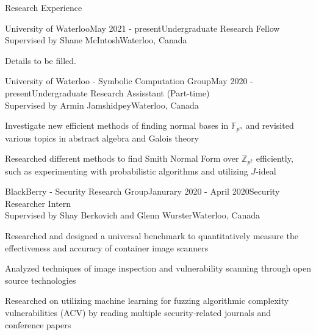 \documentclass{cv}
\begin{document}
\begin{rSection}{Research Experience}
\begin{rSubsection}{University of Waterloo}{May 2021 - present}{Undergraduate Research Fellow \\ Supervised by Shane McIntosh}{Waterloo, Canada}
	\item Details to be filled.
\end{rSubsection}

\begin{rSubsection}{University of Waterloo - Symbolic Computation Group}{May 2020 - present}{Undergraduate Research Assisstant (Part-time)\\ Supervised by Armin Jamshidpey}{Waterloo, Canada}
  	\item Investigate new efficient methods of finding normal bases in $\mathbb{F}_{p^n}$ and revisited various topics in abstract algebra and Galois theory\item Researched different methods to find Smith Normal Form over $\mathbb{Z}_{p^2}$ efficiently, such as experimenting with probabilistic algorithms and utilizing $J$-ideal
\end{rSubsection}

\begin{rSubsection}{BlackBerry - Security Research Group}{Janurary 2020 - April 2020}{Security Researcher Intern \\ Supervised by Shay Berkovich and Glenn Wurster}{Waterloo, Canada}
	\item Researched and designed a universal benchmark to quantitatively measure the effectiveness and accuracy of container image scanners
	\item Analyzed techniques of image inspection and vulnerability scanning through open source technologies
	\item Researched on utilizing machine learning for fuzzing algorithmic complexity vulnerabilities (ACV) by reading multiple security-related journals and conference papers
\end{rSubsection}
\end{rSection}
\end{document}
